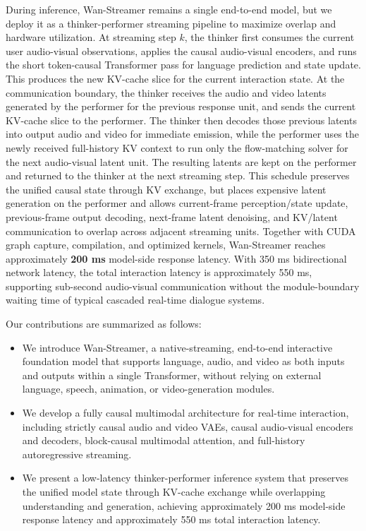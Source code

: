 \documentclass[]{style/style}
\begin{document}
During inference, Wan-Streamer remains a single end-to-end model, but we deploy it as a thinker-performer streaming pipeline to maximize overlap and hardware utilization. At streaming step $k$, the thinker first consumes the current user audio-visual observations, applies the causal audio-visual encoders, and runs the short token-causal Transformer pass for language prediction and state update. This produces the new KV-cache slice for the current interaction state. At the communication boundary, the thinker receives the audio and video latents generated by the performer for the previous response unit, and sends the current KV-cache slice to the performer. The thinker then decodes those previous latents into output audio and video for immediate emission, while the performer uses the newly received full-history KV context to run only the flow-matching solver for the next audio-visual latent unit. The resulting latents are kept on the performer and returned to the thinker at the next streaming step. This schedule preserves the unified causal state through KV exchange, but places expensive latent generation on the performer and allows current-frame perception/state update, previous-frame output decoding, next-frame latent denoising, and KV/latent communication to overlap across adjacent streaming units. Together with CUDA graph capture, compilation, and optimized kernels, Wan-Streamer reaches approximately \textbf{200 ms} model-side response latency. With 350 ms bidirectional network latency, the total interaction latency is approximately 550 ms, supporting sub-second audio-visual communication without the module-boundary waiting time of typical cascaded real-time dialogue systems.

Our contributions are summarized as follows:
\begin{itemize}
    \item We introduce Wan-Streamer, a native-streaming, end-to-end interactive foundation model that supports language, audio, and video as both inputs and outputs within a single Transformer, without relying on external language, speech, animation, or video-generation modules.
    \item We develop a fully causal multimodal architecture for real-time interaction, including strictly causal audio and video VAEs, causal audio-visual encoders and decoders, block-causal multimodal attention, and full-history autoregressive streaming.
    \item We present a low-latency thinker-performer inference system that preserves the unified model state through KV-cache exchange while overlapping understanding and generation, achieving approximately 200 ms model-side response latency and approximately 550 ms total interaction latency.
\end{itemize}
\end{document}
